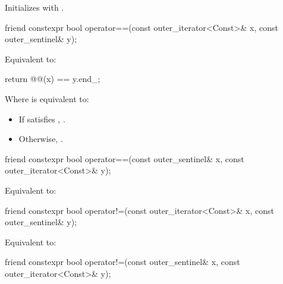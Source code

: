 {{\begin{itemdescr}
\pnum
\effects Initializes  with .
\end{itemdescr}

%
\begin{itemdecl}
friend constexpr bool operator==(const outer_iterator<Const>& x, const outer_sentinel& y);
\end{itemdecl}

\begin{itemdescr}
\pnum
\effects Equivalent to:
\begin{codeblock}
return @@(x) == y.end_;
\end{codeblock}

Where  is equivalent to:
\begin{itemize}
\item If  satisfies , .
\item Otherwise, .
\end{itemize}
\end{itemdescr}

%
\begin{itemdecl}
friend constexpr bool operator==(const outer_sentinel& x, const outer_iterator<Const>& y);
\end{itemdecl}

\begin{itemdescr}
\pnum
\effects Equivalent to: 
\end{itemdescr}

%
\begin{itemdecl}
friend constexpr bool operator!=(const outer_iterator<Const>& x, const outer_sentinel& y);
\end{itemdecl}

\begin{itemdescr}
\pnum
\effects Equivalent to: 
\end{itemdescr}

%
\begin{itemdecl}
friend constexpr bool operator!=(const outer_sentinel& x, const outer_iterator<Const>& y);
\end{itemdecl}

}}
